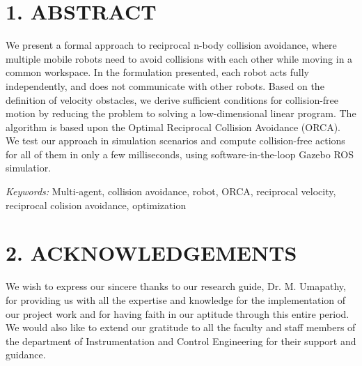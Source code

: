\documentclass[12pt]{report}
\begin{document}
\chapter*{1.  ABSTRACT}

We present a formal approach to reciprocal n-body collision
avoidance, where multiple mobile robots need to avoid collisions with each other
while moving in a common workspace. In the formulation presented, each robot acts fully independently, and does not communicate with other robots. Based on the definition
of velocity obstacles, we derive sufficient conditions for collision-free motion
by reducing the problem to solving a low-dimensional linear program. The algorithm is based upon the Optimal Reciprocal Collision Avoidance (ORCA). We test our approach in simulation scenarios and compute collision-free actions for all of them in only a few milliseconds, using software-in-the-loop Gazebo ROS simulatior.

\vspace{10mm}

\begin{flushleft}
\textit{Keywords: }Multi-agent, collision avoidance, robot, ORCA, reciprocal velocity, reciprocal colision avoidance, optimization
\end{flushleft}

\newpage
\chapter*{2.  ACKNOWLEDGEMENTS}

We wish to express our sincere thanks to our research guide, Dr. M. Umapathy, for
providing us with all the expertise and knowledge for the implementation of our
project work and for having faith in our aptitude through this entire period. We would
also like to extend our gratitude to all the faculty and staff members of the department
of Instrumentation and Control Engineering for their support and guidance.
\end{document}
